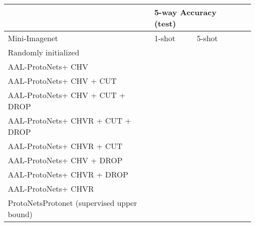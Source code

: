\documentclass{article}
\newcommand{\proto}{ProtoNets}
\newcommand{\uproto}{AAL-ProtoNets}
\begin{document}
\begin{table*}[]
\begin{center}
\begin{tabular}{|l|l|l|l|l|}
\hline
                        & \multicolumn{2}{l|}{5-way Accuracy (test)}  \\ \hline
Mini-Imagenet                & 1-shot           & 5-shot           \\ \hline
Randomly initialized                     &  &       \\\hline
\uproto + CHV                      &  & \\\hline
\uproto + CHV + CUT                &  &  \\\hline
\uproto + CHV + CUT + DROP         &  &  \\\hline
\uproto + CHVR + CUT + DROP     &  &  \\\hline
\uproto + CHVR + CUT            &  &  \\\hline
\uproto + CHV + DROP               &  &  \\\hline
\uproto + CHVR + DROP           &  &  \\\hline
\uproto + CHVR                  &  &  \\\hline
\proto Protonet (supervised upper bound) &  &  \\\hline

\end{tabular}
\caption{\uproto\ ablation studies.}
\label{table:uproto-ablation-mini-imagenet}
\end{center}
\vspace{-5mm}
\end{table*}
\end{document}
